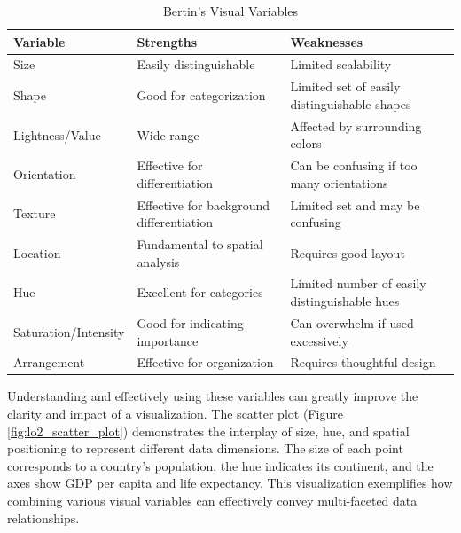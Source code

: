 \begin{table}[h]
    \centering
    \renewcommand{\arraystretch}{1.5} %
    \begin{tabularx}{\textwidth}{|X|X|X|}
\hline
\textbf{Variable}    & \textbf{Strengths}                       & \textbf{Weaknesses}                           \\
\hline \hline
Size                 & Easily distinguishable                   & Limited scalability                           \\
\hline
Shape                & Good for categorization                  & Limited set of easily distinguishable shapes  \\
\hline
Lightness/Value      & Wide range                               & Affected by surrounding colors                \\
\hline
Orientation          & Effective for differentiation            & Can be confusing if too many orientations     \\
\hline
Texture              & Effective for background differentiation & Limited set and may be confusing              \\
\hline
Location             & Fundamental to spatial analysis          & Requires good layout                          \\
\hline
Hue                  & Excellent for categories                 & Limited number of easily distinguishable hues \\
\hline
Saturation/Intensity & Good for indicating importance           & Can overwhelm if used excessively             \\
\hline
Arrangement          & Effective for organization               & Requires thoughtful design                    \\
\hline
    \end{tabularx}
    \caption{Bertin's Visual Variables}
    \label{tab:bertin_variables}
\end{table}

Understanding and effectively using these variables can greatly improve the clarity and impact of a visualization. The scatter plot (Figure \ref{fig:lo2_scatter_plot}) demonstrates the interplay of size, hue, and spatial positioning to represent different data dimensions. The size of each point corresponds to a country's population, the hue indicates its continent, and the axes show GDP per capita and life expectancy. This visualization exemplifies how combining various visual variables can effectively convey multi-faceted data relationships.

